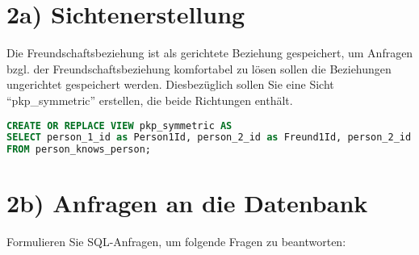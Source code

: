 





\section*{2a) Sichtenerstellung}
Die Freundschaftsbeziehung ist als gerichtete Beziehung gespeichert, um Anfragen bzgl. der Freundschaftsbeziehung komfortabel zu lösen sollen die Beziehungen ungerichtet gespeichert werden.
Diesbezüglich sollen Sie eine Sicht \enquote{pkp\_symmetric} erstellen, die beide Richtungen enthält.

\begin{lstlisting}[language=sql]
CREATE OR REPLACE VIEW pkp_symmetric AS
SELECT person_1_id as Person1Id, person_2_id as Freund1Id, person_2_id as Person2Id, person_1_id as Freund2Id, creationdate
FROM person_knows_person;
\end{lstlisting}

\section*{2b) Anfragen an die Datenbank}
Formulieren Sie SQL-Anfragen, um folgende Fragen zu beantworten:

